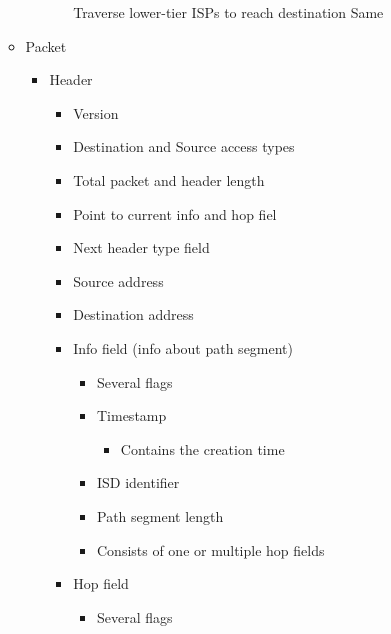 \begin{itemize}
\begin{itemize}
\begin{itemize}
\begin{itemize}
                             Traverse lower-tier ISPs to reach destination
                             Same
                        \end{itemize}
                \end{itemize}
            \item Packet
                \begin{itemize}
                    \item Header
                        \begin{itemize}
                            \item Version
                            \item Destination and Source access types
                            \item Total packet and header length
                            \item Point to current info and hop fiel
                            \item Next header type field
                            \item Source address
                            \item Destination address
                            \item Info field (info about path segment)
                                \begin{itemize}
                                    \item Several flags
                                    \item Timestamp
                                        \begin{itemize}
                                            \item Contains the creation time
                                        \end{itemize}
                                    \item ISD identifier
                                    \item Path segment length
                                    \item Consists of one or multiple hop fields
                                \end{itemize}
                            \item Hop field
                                \begin{itemize}
                                    \item Several flags

\end{itemize}
\end{itemize}
\end{itemize}
\end{itemize}
\end{itemize}

